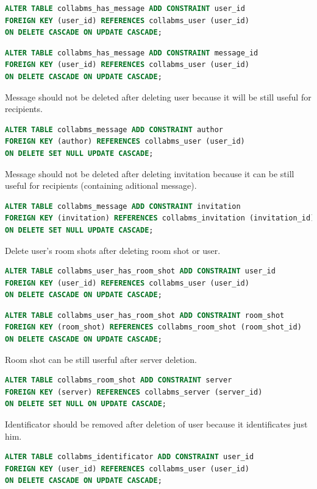 \documentclass[12pt,oneside,a4paper]{article}
\begin{document}
\begin{lstlisting}[language=SQL]
ALTER TABLE collabms_has_message ADD CONSTRAINT user_id
FOREIGN KEY (user_id) REFERENCES collabms_user (user_id)
ON DELETE CASCADE ON UPDATE CASCADE;
\end{lstlisting}

\begin{lstlisting}[language=SQL]
ALTER TABLE collabms_has_message ADD CONSTRAINT message_id
FOREIGN KEY (user_id) REFERENCES collabms_user (user_id)
ON DELETE CASCADE ON UPDATE CASCADE;
\end{lstlisting}

\noindent
Message should not be deleted after deleting user because it will be still useful for recipients.

\begin{lstlisting}[language=SQL]
ALTER TABLE collabms_message ADD CONSTRAINT author
FOREIGN KEY (author) REFERENCES collabms_user (user_id)
ON DELETE SET NULL UPDATE CASCADE;
\end{lstlisting}

\noindent
Message should not be deleted after deleting invitation because it can be still useful for recipients (containing aditional message).

\begin{lstlisting}[language=SQL]
ALTER TABLE collabms_message ADD CONSTRAINT invitation
FOREIGN KEY (invitation) REFERENCES collabms_invitation (invitation_id)
ON DELETE SET NULL UPDATE CASCADE;
\end{lstlisting}

\noindent
Delete user's room shots after deleting room shot or user.

\begin{lstlisting}[language=SQL]
ALTER TABLE collabms_user_has_room_shot ADD CONSTRAINT user_id
FOREIGN KEY (user_id) REFERENCES collabms_user (user_id)
ON DELETE CASCADE ON UPDATE CASCADE;
\end{lstlisting}

\begin{lstlisting}[language=SQL]
ALTER TABLE collabms_user_has_room_shot ADD CONSTRAINT room_shot
FOREIGN KEY (room_shot) REFERENCES collabms_room_shot (room_shot_id)
ON DELETE CASCADE ON UPDATE CASCADE;
\end{lstlisting}

\noindent
Room shot can be still userful after server deletion.

\begin{lstlisting}[language=SQL]
ALTER TABLE collabms_room_shot ADD CONSTRAINT server
FOREIGN KEY (server) REFERENCES collabms_server (server_id)
ON DELETE SET NULL ON UPDATE CASCADE;
\end{lstlisting}

\noindent
Identificator should be removed after deletion of user because it identificates just him.

\begin{lstlisting}[language=SQL]
ALTER TABLE collabms_identificator ADD CONSTRAINT user_id
FOREIGN KEY (user_id) REFERENCES collabms_user (user_id)
ON DELETE CASCADE ON UPDATE CASCADE;
\end{lstlisting}
\end{document}
